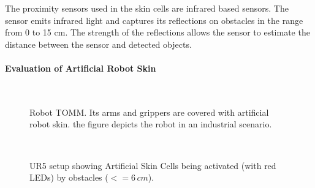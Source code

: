 The proximity sensors used in the skin cells are infrared based sensors. The sensor emits infrared light and captures its reflections on obstacles 
in the range from 0 to 15 cm. The strength of the reflections allows the sensor to estimate the distance between the sensor and detected objects.  

\paragraph{Evaluation of Artificial Robot Skin}
\begin{figure}[h]
\centering
{}\\[-10pt]
\caption[]{Robot TOMM. Its arms and grippers are covered with artificial robot skin. the figure depicts the robot in an industrial scenario.}
\label{fig:TommSorting}
\end{figure}

\begin{figure}[h]
\centering
{}\\[-10pt]
\caption[]{UR5 setup showing Artificial Skin Cells being activated (with red LEDs) by obstacles ($<= 6\,cm$).}
\label{fig:TUDSetup}
\end{figure}

